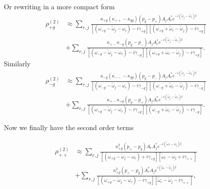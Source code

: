 \documentclass[preprint,secnumarabic,amssymb, nobibnotes, aip, prd]{revtex4-1}
\def\tw{\tilde{\omega}}
\def\tw{\tilde{\omega}}
\begin{document}
	Or rewriting  in a more compact form 
	\begin{align}
	\rho_{+g}^{(2)} &\approx  \sum_{r,j} \frac{\kappa_{+g}(\kappa_{++}-\kappa_{gg})(p_g-p_+) A_j A_r^* e^{-i(\tw_j-\tw_r)t}}{[( \omega_{+ g} - \tw_j-\omega_c) -i\gamma_{+ g}][( \omega_{+ g} +\tw_r- \tw_j) -i\gamma_{+ g}]} \nonumber \\ 
	&+\sum_{r,j}\frac{\kappa_{+-}\kappa_{-g}(p_g-p_-) A_j A_r^* e^{-i(\tw_j-\tw_r)t}}{[( \omega_{-g} - \tw_j-\omega_c) -i\gamma_{-g}][( \omega_{+ g} +\tw_r- \tw_j) -i\gamma_{+ g}]}.
	\end{align}
	Similarly
	\begin{align}
	\rho_{-g}^{(2)} &\approx  \sum_{r,j} \frac{\kappa_{-g}(\kappa_{--}-\kappa_{gg})(p_g-p_-) A_j A_r^* e^{-i(\tw_j-\tw_r)t}}{[( \omega_{- g} - \tw_j-\omega_c) -i\gamma_{- g}][( \omega_{- g} +\tw_r- \tw_j) -i\gamma_{- g}]} \nonumber \\ 
	&+\sum_{r,j}\frac{\kappa_{+-}\kappa_{+g}(p_g-p_+) A_j A_r^* e^{-i(\tw_j-\tw_r)t}}{[( \omega_{+g} - \tw_j-\omega_c) -i\gamma_{+g}][( \omega_{- g} +\tw_r- \tw_j) -i\gamma_{- g}]}.
	\end{align}
	
	
	
	
	\newpage
	Now we finally have the second order terms
	
	
	\begin{align}
	\label{eq:rho_2_pp_solution_fin}
	\rho_{++}^{(2)} &\approx 
	\sum_{r,j} \frac{\kappa_{+g}^2 (p_+-p_g) A_rA_j^*e^{-i(\tw_r-\tw_j)t}}{[( \omega_{+ g} - \tw_j-\omega_c) +i\gamma_{+ g}][ \tw_r-\tw_j +i\gamma_{++}]} \nonumber \\
	& + \sum_{r,j} \frac{\kappa_{+g}^2 (p_+-p_g) A_r^*A_je^{i(\tw_r-\tw_j)t}}{[( \omega_{+ g} - \tw_j-\omega_c) -i\gamma_{+ g}][ \tw_r-\tw_j -i\gamma_{++}]},
	\end{align}
\end{document}
